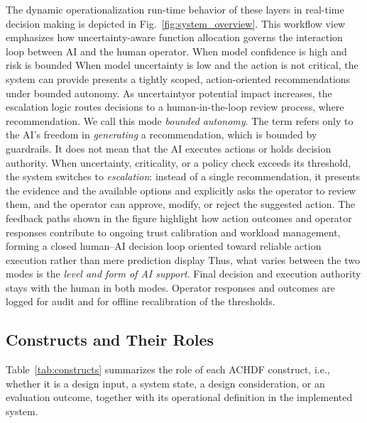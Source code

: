 \documentclass[journal]{IEEEtran}
\theoremstyle{plain}
\theoremstyle{definition}
\providecommand{\DIFaddtex}[1]{{\protect\color{blue} \sf #1}} %
\providecommand{\DIFdeltex}[1]{{\protect\color{red} \scriptsize #1}} %
\providecommand{\DIFaddbegin}{} %
\providecommand{\DIFaddend}{} %
\providecommand{\DIFdelbegin}{} %
\providecommand{\DIFdelend}{} %
\providecommand{\DIFadd}[1]{\texorpdfstring{\DIFaddtex{#1}}{#1}} %
\providecommand{\DIFdel}[1]{\texorpdfstring{\DIFdeltex{#1}}{}} %
\newcommand{\DIFscaledelfig}{0.5}
\newlength{\DIFdelgraphicswidth} %
\newlength{\DIFdelgraphicsheight} %
\newcommand{\DIFaddincludegraphics}[2][]{{\color{blue}\fbox{\DIFOincludegraphics[#1]{#2}}}} %
\newcommand{\DIFdelincludegraphics}[2][]{%
\sbox{\DIFdelgraphicsbox}{\DIFOincludegraphics[#1]{#2}}%
\settoboxwidth{\DIFdelgraphicswidth}{\DIFdelgraphicsbox} %
\settoboxtotalheight{\DIFdelgraphicsheight}{\DIFdelgraphicsbox} %
\scalebox{\DIFscaledelfig}{%
\parbox[b]{\DIFdelgraphicswidth}{\usebox{\DIFdelgraphicsbox}\\[-\baselineskip] \rule{\DIFdelgraphicswidth}{0em}}\llap{\resizebox{\DIFdelgraphicswidth}{\DIFdelgraphicsheight}{%
\setlength{\unitlength}{\DIFdelgraphicswidth}%
\begin{picture}(1,1)%
\thicklines\linethickness{2pt} %
{\color[rgb]{1,0,0}\put(0,0){\framebox(1,1){}}}%
{\color[rgb]{1,0,0}\put(0,0){\line( 1,1){1}}}%
{\color[rgb]{1,0,0}\put(0,1){\line(1,-1){1}}}%
\end{picture}%
}\hspace*{3pt}}} %
} %
\DeclareRobustCommand{\DIFaddbegin}{\DIFOaddbegin \let\includegraphics\DIFaddincludegraphics} %
\DeclareRobustCommand{\DIFaddend}{\DIFOaddend \let\includegraphics\DIFOincludegraphics} %
\DeclareRobustCommand{\DIFdelbegin}{\DIFOdelbegin \let\includegraphics\DIFdelincludegraphics} %
\DeclareRobustCommand{\DIFdelend}{\DIFOaddend \let\includegraphics\DIFOincludegraphics} %
\begin{document}
The \DIFdelbegin \DIFdel{dynamic operationalization }\DIFdelend \DIFaddbegin \DIFadd{run-time behavior }\DIFaddend of these layers \DIFdelbegin \DIFdel{in real-time decision making }\DIFdelend is depicted in Fig.~\ref{fig:system_overview}.
\DIFdelbegin \DIFdel{This workflow view emphasizes how uncertainty-aware function allocation governs the interaction loop between AI and the human operator. When model confidence is high and risk is bounded}\DIFdelend \DIFaddbegin \DIFadd{When model uncertainty is low and the action is not critical}\DIFaddend , the system \DIFdelbegin \DIFdel{can provide }\DIFdelend \DIFaddbegin \DIFadd{presents a }\DIFaddend tightly scoped, action-oriented \DIFdelbegin \DIFdel{recommendations under bounded autonomy. As uncertaintyor potential impact increases, the escalation logic routes decisions to a human-in-the-loop review process, where }\DIFdelend \DIFaddbegin \DIFadd{recommendation. We call this mode \emph{bounded autonomy}. The term refers only to the AI's freedom in \emph{generating} a recommendation, which is bounded by guardrails. It does not mean that the AI executes actions or holds decision authority. When uncertainty, criticality, or a policy check exceeds its threshold, the system switches to \emph{escalation}: instead of a single recommendation, it presents the evidence and the available options and explicitly asks the operator to review them, and }\DIFaddend the operator can approve, modify, or reject the suggested action. \DIFdelbegin \DIFdel{The feedback paths shown in the figure highlight how action outcomes and operator responses contribute to ongoing trust calibration and workload management, forming a closed human--AI decision loop oriented toward reliable action execution rather than mere prediction display}\DIFdelend \DIFaddbegin \DIFadd{Thus, what varies between the two modes is the \emph{level and form of AI support}. Final decision and execution authority stays with the human in both modes. Operator responses and outcomes are logged for audit and for offline recalibration of the thresholds.
}

    \subsection{\DIFadd{Constructs and Their Roles}}
    \label{sec:constructs}
    \DIFadd{Table~\ref{tab:constructs} summarizes the role of each ACHDF construct, i.e., whether it is a design input, a system state, a design consideration, or an evaluation outcome, together with its operational definition in the implemented system}\DIFaddend .
\end{document}
